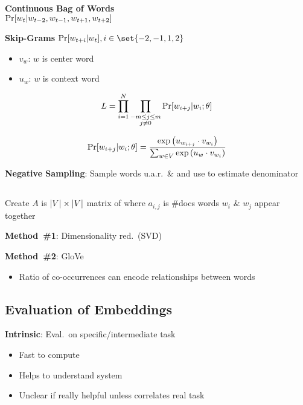 \documentclass[9pt]{extarticle}
\renewcommand{\green}[1]{{\color{ForestGreen} #1}}
\newcommand{\greenbf}[1]{\textbf{\green{#1}}}
\begin{document}
\begin{multicols}{3}
  \greenbf{Continuous Bag of Words} \\ ${\Pr\lbrack w_t \vert w_{t-2}, w_{t-1}, w_{t+1}, w_{t+2}\rbrack}$

  \greenbf{Skip-Grams} ${\Pr\sbrack{w_{t+i} \vert w_{t}}, i \in \set{-2,-1,1,2}}$
  \begin{itemize}
    \item $v_w$: $w$ is center word
    \item $u_w$: $w$ is context word
  \end{itemize}

  \begin{equation*}
    L = \prod_{i=1}^{N} \prod_{\substack{-m \leq j \leq m \\ j \ne 0}} \Pr\lbrack w_{i+j} \vert w_{i} ; \theta\rbrack
  \end{equation*}

  \begin{equation*}
    \Pr\lbrack w_{i+j} \vert w_{i} ; \theta\rbrack = \frac{\exp\left(u_{w_{i+j}} \cdot v_{w_i} \right)}{\sum_{w \in V} \exp\left(u_{w} \cdot v_{w_i} \right)}
  \end{equation*}

  \greenbf{Negative Sampling}: Sample words u.a.r.\ \& and use to estimate denominator

  \subsection*{}

  Create $A$ is ${\lvert V\rvert \times \lvert V\rvert}$ matrix of where $a_{i,j}$ is \#docs words $w_i$ \& $w_j$ appear together

  \greenbf{Method~\#1}: Dimensionality red.\ (SVD)

  \greenbf{Method~\#2}: GloVe
  \begin{itemize}
    \item Ratio of co-occurrences can encode relationships between words
  \end{itemize}

  \subsection*{Evaluation of Embeddings}

  \greenbf{Intrinsic}: Eval.\ on specific/intermediate task
  \begin{itemize}
    \item Fast to compute
    \item Helps to understand system
    \item Unclear if really helpful unless correlates real task
  \end{itemize}


\end{multicols}
\end{document}
